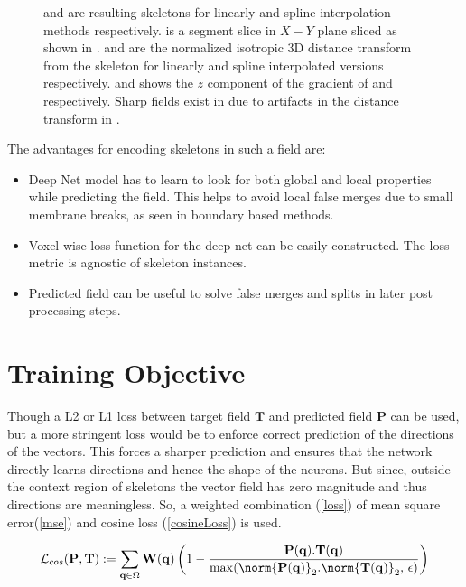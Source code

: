 \begin{figure}[htpb]
\begin{subfigure}[b]{\mywidth}
		\caption{\label{fig:grad_spline}}
	\end{subfigure}
	\caption{  and  are resulting skeletons for linearly and spline interpolation methods respectively.  is a segment slice in $X-Y$ plane sliced as shown in .  and  are the normalized isotropic 3D distance transform from the skeleton for linearly and spline interpolated versions respectively.  and  shows the $z$ component of the gradient of  and  respectively. Sharp fields exist in  due to artifacts in the distance transform in .}
	\label{fig:splineInterpolation}
\end{figure}


The advantages for encoding skeletons in such a field are:
\begin{itemize}
	\item Deep Net model has to learn to look for both global and local properties while predicting the field. This helps to avoid local false merges due to small membrane breaks, as seen in boundary based methods.
	\item Voxel wise loss function for the deep net can be easily constructed. The loss metric is agnostic of skeleton instances.
	\item Predicted field can be useful to solve false merges and splits in later post processing steps.
\end{itemize}

\section{Training Objective}
Though a L2 or L1 loss between target field $\mathbf{T}$ and predicted field $\mathbf{P}$ can be used, but a more stringent loss would be to enforce correct prediction of the directions of the vectors. This forces a sharper prediction and ensures that the network directly learns directions and hence the shape of the neurons. But since, outside the context region of skeletons the vector field has zero magnitude and thus directions are meaningless. So, a weighted combination (\autoref{loss}) of mean square error(\autoref{mse}) and cosine loss (\autoref{cosineLoss}) is used.

\begin{equation}\label{cosineLoss}
\mathcal{L}_{cos}(\mathbf{P}, \mathbf{T}) := \sum_{\mathbf{q} \in \Omega} \mathbf{W}(\mathbf{q})\left( 1 - \frac{\mathbf{P}(\mathbf{q}).\mathbf{T}(\mathbf{q})}{\max(\norm{\mathbf{P}(\mathbf{q})}_2.\norm{\mathbf{T}(\mathbf{q})}_2,\,\epsilon)} \right)
\end{equation}

